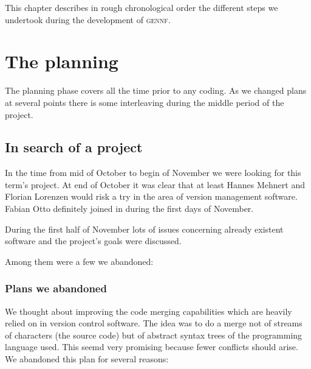 \documentclass[fleqn, 10pt, a4paper]{report} \usepackage{amssymb}
\newcommand{\GENNF}{\textsc{gennf}}
\begin{document}
This chapter describes in rough chronological order the different
steps we undertook during the development of \GENNF{}.

\section{The planning}

The planning phase covers all the time prior to any coding. As we
changed plans at several points there is some interleaving during the
middle period of the project.

\subsection{In search of a project}

In the time from mid of October to begin of November we were looking
for this term's project. At end of October it was clear that at least
Hannes Mehnert and Florian Lorenzen would risk a try in the area of
version management software. Fabian Otto definitely joined in during
the first days of November.

During the first half of November lots of issues concerning already
existent software and the project's goals were discussed.

Among them were a few we abandoned:

\subsubsection{Plans we abandoned}

We thought about improving the code merging capabilities which are
heavily relied on in version control software. The idea was to do a
merge not of streams of characters (the source code) but of abstract
syntax trees of the programming language used. This seemd very
promising because fewer conflicts should arise. We abandoned this plan
for several reasons:
\end{document}
